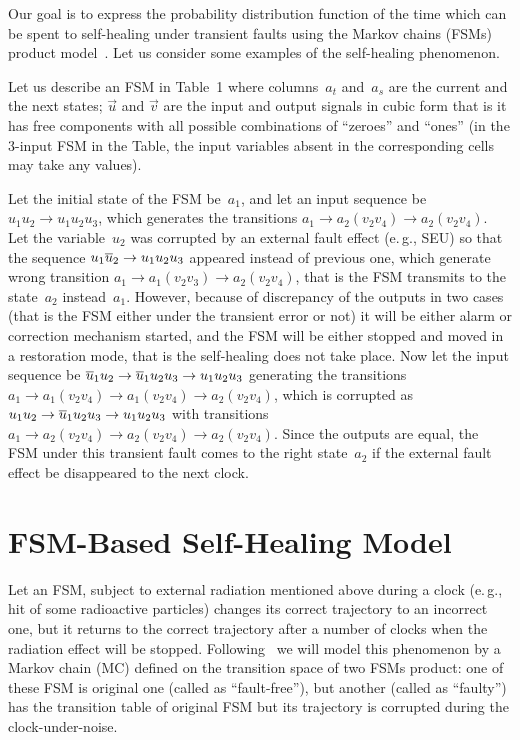\begin{multicols}{2}
Our goal is to  express  the  probability
distribution function of the  time which can be spent
to self-healing  under transient faults  using the
Markov chains (FSMs) product model~\cite{7fr, 8fr}.
Let us consider some examples of the self-healing
phenomenon.

Let us describe an FSM in Table~1 where columns~$a_t$
and~$a_s$  are the current and the next states;
$\vec u$ and $\vec v$ are the input and output signals in cubic
form that is it has free components with all
possible combinations of ``zeroes'' and ``ones''
(in the 3-input FSM in the Table, the input variables
absent in the corresponding cells may take any
values).

Let the initial state of the FSM be~$a_1$, and let an
input sequence be $u_1u_2\to u_1u_2u_3$, which generates
the transitions $a_1\to a_2(v_2v_4)\to a_2(v_2v_4)$.
Let the variable~$u_2$ was corrupted by an external
fault effect (e.\,g., SEU) so that the sequence
$u_1\overline u_2\to u_1u_2u_3$ appeared instead of previous
one, which generate wrong transition
$a_1\to a_1(v_2v_3)\to a_2(v_2v_4)$, that is the FSM
transmits to the state~$a_2$ instead~$a_1$.
However, because of discrepancy of the outputs in
two cases (that is the FSM either under the transient
error or not) it will be  either alarm or correction
mechanism  started, and the FSM will be either
stopped and moved in a restoration mode, that is the
self-healing does not take place.
Now let the input sequence be
$\overline u_1u_2\to \overline u_1u_2u_3\to u_1u_2u_3$ generating the
transitions
$a_1\to a_1(v_2v_4)\to a_1(v_2v_4)\to a_2(v_2v_4)$,
which is corrupted as
$u_1u_2\to \overline u_1u_2u_3\to u_1u_2u_3$ with
transitions
$a_1\to a_2(v_2v_4)\to a_2(v_2v_4)\to a_2(v_2v_4)$.
Since the outputs are equal, the FSM under this
transient fault comes to the right state~$a_2$
if the external fault effect be disappeared to
the next clock.

\section{FSM-Based Self-Healing Model}

Let an FSM, subject to external radiation mentioned
above during a clock (e.\,g., hit of some radioactive
particles) changes its correct trajectory to an
incorrect one, but it returns to the correct trajectory
after a number of clocks when the radiation effect will
be stopped.
Following~\cite{7fr} we will model this phenomenon by a
Markov chain (MC) defined on the transition space of
two FSMs product: one of these FSM is original one
(called as ``fault-free''), but another (called as
``faulty'') has the transition table of original
FSM but its trajectory is corrupted during the
clock-under-noise.


\end{multicols}
